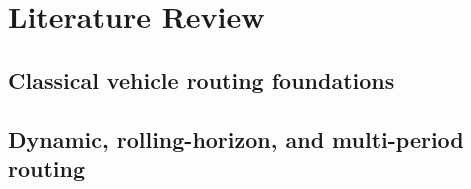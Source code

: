 \chapter{Literature Review}
\label{chap:literature_review}


%

\section{Classical vehicle routing foundations}
%
%

\section{Dynamic, rolling-horizon, and multi-period routing}
%
%

